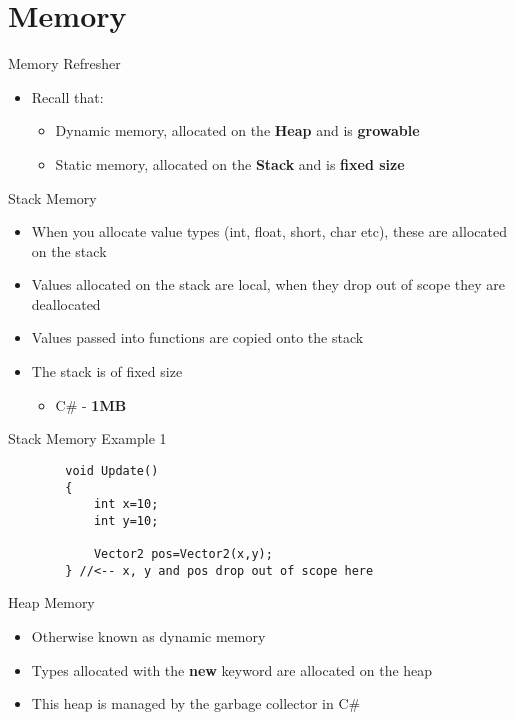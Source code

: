 \part{Memory}
\frame{\partpage}

\begin{frame}{Memory Refresher}
	\begin{itemize}
		\pause \item Recall that:
		\begin{itemize}
			\pause \item Dynamic memory, allocated on the \textbf{Heap} and is \textbf{growable}
			\pause \item Static memory, allocated on the \textbf{Stack} and is \textbf{fixed size}
		\end{itemize}
	\end{itemize}
\end{frame}

\begin{frame}{Stack Memory}
	\begin{itemize}
		\pause \item When you allocate value types (int, float, short, char etc), these are allocated on the stack
		\pause \item Values allocated on the stack are local, when they drop out of scope they are deallocated  
		\pause \item Values passed into functions are copied onto the stack
		\pause \item The stack is of fixed size
		\begin{itemize}
			\item C\# - \textbf{1MB}
		\end{itemize}
	\end{itemize}
\end{frame}

\begin{frame}[fragile]{Stack Memory Example 1}
	\begin{lstlisting}
		void Update()
		{
			int x=10;
			int y=10;
	
			Vector2 pos=Vector2(x,y);
		} //<-- x, y and pos drop out of scope here
	\end{lstlisting} 
\end{frame}


\begin{frame}{Heap Memory}
	\begin{itemize}
	\pause \item Otherwise known as dynamic memory
	\pause \item Types allocated with the \textbf{new} keyword are allocated on the heap
	\pause \item This heap is managed by the garbage collector in C\#
	\end{itemize}
\end{frame}

